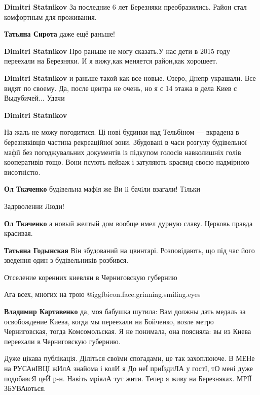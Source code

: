 \begin{itemize}
\begin{itemize} %
\textbf{Dimitri Statnikov} За последние 6 лет Березняки преобразились.
Район стал комфортным для проживания.

\textbf{Татьяна Сирота} даже ещё раньше!

\textbf{Dimitri Statnikov} Про раньше не могу сказать.У нас дети в 2015 году переехали на Березняки. И я вижу,как меняется район,как хорошеет.

\textbf{Dimitri Statnikov} и раньше такой как все новые. Озеро, Днепр украшали. Все видят по своему. Да, после центра не очень, но я с 14 этажа в дела Киев с Выдубичей...
Удачи

\textbf{Dimitri Statnikov} 

На жаль не можу погодитися. Ці нові будинки над Тельбіном — вкрадена в
березняківців частина рекреаційної зони. Збудовані в часи розгулу будівельної
мафії без погоджувальних документів із підкупом голосів навколишніх голів
кооперативів тощо. Вони псують пейзаж і затуляють краєвид своєю надмірною
висотністю.

\begin{itemize} %
\textbf{Ол Ткаченко} будiвельна мафiя же Ви ii бачiли взагали! Тiльки

Задрволенни Люди!

\textbf{Ол Ткаченко} а новый желтый дом вообще имел дурную славу. Церковь правда красивая.

\textbf{Татьяна Годынская} Він збудований на цвинтарі. Розповідають, що під час його зведення один з будівельників розбився.
\end{itemize} %

\end{itemize} %

Отселение коренних киевлян в Черниговскую губернию

\begin{itemize} %
Ага всех, многих на трою @igg{fbicon.face.grinning.smiling.eyes} 

\textbf{Владимир Картавенко} да, моя бабушка шутила: Вам должны дать медаль за освобождение Киева, когда мы переехали на Бойченко, возле метро Черниговская, тогда Комсомольская. Я не понимала, она поясняла: вы из Киева переехали в Черниговскую губернию.
\end{itemize} %


Дуже цікава публікація. Діліться своїми спогадами, це так захоплююче. В МЕНе на
РУСАнІВЦІ жИлА знайома і колИ я До неЇ приЇздиЛА у гостІ, тО мені дуже
подобавсЯ цеЙ р-н. Навіть мріялА тут жити. Тепер я живу на Березняках. МРІЇ
ЗБУВАються.






\end{itemize} %
